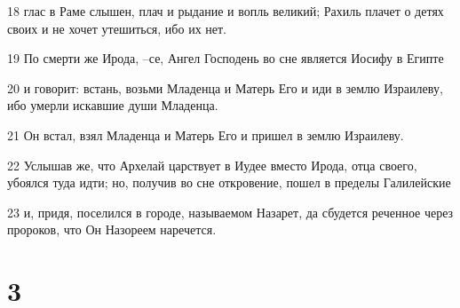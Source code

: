 \par 18 глас в Раме слышен, плач и рыдание и вопль великий; Рахиль плачет о детях своих и не хочет утешиться, ибо их нет.
\par 19 По смерти же Ирода, --се, Ангел Господень во сне является Иосифу в Египте
\par 20 и говорит: встань, возьми Младенца и Матерь Его и иди в землю Израилеву, ибо умерли искавшие души Младенца.
\par 21 Он встал, взял Младенца и Матерь Его и пришел в землю Израилеву.
\par 22 Услышав же, что Архелай царствует в Иудее вместо Ирода, отца своего, убоялся туда идти; но, получив во сне откровение, пошел в пределы Галилейские
\par 23 и, придя, поселился в городе, называемом Назарет, да сбудется реченное через пророков, что Он Назореем наречется.

\chapter{3}


